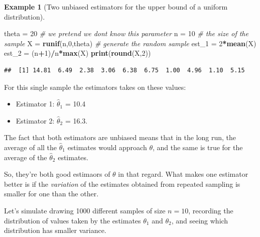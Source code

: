 \documentclass[
]{book}
\newenvironment{Shaded}{\begin{snugshade}}{\end{snugshade}}
\newcommand{\CommentTok}[1]{\textcolor[rgb]{0.56,0.35,0.01}{\textit{#1}}}
\newcommand{\DecValTok}[1]{\textcolor[rgb]{0.00,0.00,0.81}{#1}}
\newcommand{\FunctionTok}[1]{\textcolor[rgb]{0.13,0.29,0.53}{\textbf{#1}}}
\newcommand{\NormalTok}[1]{#1}
\newcommand{\OtherTok}[1]{\textcolor[rgb]{0.56,0.35,0.01}{#1}}
\newcommand{\SpecialCharTok}[1]{\textcolor[rgb]{0.81,0.36,0.00}{\textbf{#1}}}
\providecommand{\tightlist}{%
  \setlength{\itemsep}{0pt}\setlength{\parskip}{0pt}}
\theoremstyle{definition}
\theoremstyle{definition}
\newtheorem{example}{Example}[chapter]
\theoremstyle{definition}
\theoremstyle{definition}
\theoremstyle{remark}
\begin{document}
\begin{example}[Two unbiased estimators for the upper bound of a uniform distribution]
\begin{Shaded}
\begin{Highlighting}[]
\NormalTok{theta }\OtherTok{=} \DecValTok{20} \CommentTok{\# we pretend we don\textquotesingle{}t know this parameter}
\NormalTok{n }\OtherTok{=} \DecValTok{10} \CommentTok{\# the size of the sample}
\NormalTok{X }\OtherTok{=} \FunctionTok{runif}\NormalTok{(n,}\DecValTok{0}\NormalTok{,theta) }\CommentTok{\# generate the random sample}
\NormalTok{est\_1 }\OtherTok{=} \DecValTok{2}\SpecialCharTok{*}\FunctionTok{mean}\NormalTok{(X)}
\NormalTok{est\_2 }\OtherTok{=}\NormalTok{ (n}\SpecialCharTok{+}\DecValTok{1}\NormalTok{)}\SpecialCharTok{/}\NormalTok{n}\SpecialCharTok{*}\FunctionTok{max}\NormalTok{(X)}
\FunctionTok{print}\NormalTok{(}\FunctionTok{round}\NormalTok{(X,}\DecValTok{2}\NormalTok{))}
\end{Highlighting}
\end{Shaded}

\begin{verbatim}
##  [1] 14.81  6.49  2.38  3.06  6.38  6.75  1.00  4.96  1.10  5.15
\end{verbatim}

For this single sample the estimators takes on these values:

\begin{itemize}
\tightlist
\item
  Estimator 1: \(\hat{\theta}_1\) = 10.4
\item
  Estimator 2: \(\hat{\theta}_2\) = 16.3.
\end{itemize}

The fact that both estimators are unbiased means that in the long run, the average of all the \(\hat{\theta}_1\) estimates would approach \(\theta\), and the same is true for the average of the \(\hat{\theta}_2\) estimates.

So, they're both good estimaors of \(\theta\) in that regard. What makes one estimator better is if the \emph{variation} of the estimates obtained from repeated sampling is smaller for one than the other.

Let's simulate drawing 1000 different samples of size \(n = 10\), recording the distribution of values taken by the estimates \(\theta_1\) and \(\theta_2\), and seeing which distribution has smaller variance.


\end{example}
\end{document}
